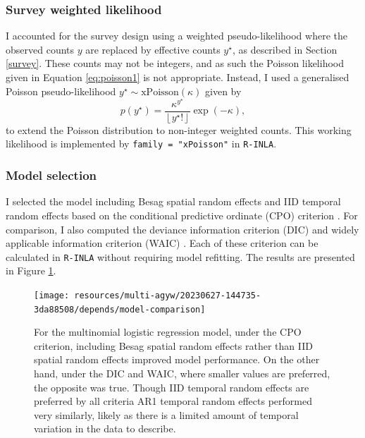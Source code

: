 \documentclass[a4paper, nobind]{templates/ociamthesis}
\begin{document}
\hypertarget{survey-weighted-likelihood}{%
\subsubsection{Survey weighted likelihood}\label{survey-weighted-likelihood}}

I accounted for the survey design using a weighted pseudo-likelihood where the observed counts \(y\) are replaced by effective counts \(y^\star\), as described in Section \ref{survey}.
These counts may not be integers, and as such the Poisson likelihood given in Equation \eqref{eq:poisson1} is not appropriate.
Instead, I used a generalised Poisson pseudo-likelihood \(y^\star \sim \text{xPoisson}(\kappa)\) given by
\begin{equation}
    p(y^\star) = \frac{\kappa^{y^\star}}{\left \lfloor{y^\star!}\right \rfloor } \exp \left(- \kappa \right),
\end{equation}
to extend the Poisson distribution to non-integer weighted counts.
This working likelihood is implemented by \texttt{family\ =\ "xPoisson"} in \texttt{R-INLA}.

\hypertarget{model-selection}{%
\subsubsection{Model selection}\label{model-selection}}

I selected the model including Besag spatial random effects and IID temporal random effects based on the conditional predictive ordinate (CPO) criterion \autocite{pettit1990conditional}.
For comparison, I also computed the deviance information criterion (DIC) \autocite{spiegelhalter2002bayesian} and widely applicable information criterion (WAIC) \autocite{watanabe2013widely}.
Each of these criterion can be calculated in \texttt{R-INLA} without requiring model refitting.
The results are presented in Figure \ref{fig:model-comparison}.



\begin{figure}
\texttt{[image: resources/multi-agyw/20230627-144735-3da88508/depends/model-comparison]} \caption{For the multinomial logistic regression model, under the CPO criterion, including Besag spatial random effects rather than IID spatial random effects improved model performance. On the other hand, under the DIC and WAIC, where smaller values are preferred, the opposite was true. Though IID temporal random effects are preferred by all criteria AR1 temporal random effects performed very similarly, likely as there is a limited amount of temporal variation in the data to describe.}\label{fig:model-comparison}
\end{figure}
\end{document}

